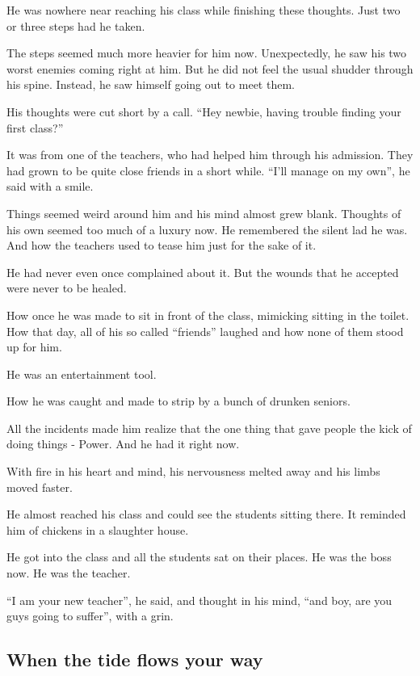 \documentclass[twoside,11pt,titlepage]{article}
\begin{document}
He was nowhere near reaching his class while finishing these thoughts. Just two or three steps had he taken.

The steps seemed much more heavier for him now. Unexpectedly, he saw his two worst enemies coming right at him. But he did not feel the usual shudder through his spine. Instead, he saw himself going out to meet them.

His thoughts were cut short by a call. ``Hey newbie, having trouble finding your first class?''

It was from one of the teachers, who had helped him through his admission. They had grown to be quite close friends in a short while. ``I'll manage on my own'', he said with a smile.

Things seemed weird around him and his mind almost grew blank. Thoughts of his own seemed too much of a luxury now. He remembered the silent lad he was. And how the teachers used to tease him just for the sake of it.

He had never even once complained about it. But the wounds that he accepted were never to be healed.

How once he was made to sit in front of the class, mimicking sitting in the toilet. How that day, all of his so called ``friends'' laughed and how none of them stood up for him.

He was an entertainment tool.

How he was caught and made to strip by a bunch of drunken seniors.

All the incidents made him realize that the one thing that gave people the kick of doing things - Power. And he had it right now.

With fire in his heart and mind, his nervousness melted away and his limbs moved faster.

He almost reached his class and could see the students sitting there. It reminded him of chickens in a slaughter house.

He got into the class and all the students sat on their places. He was the boss now. He was the teacher.

``I am your new teacher'', he said, and thought in his mind, ``and boy, are you guys going to suffer'', with a grin.

\newpage
\begin{center}
  \section{When the tide flows your way}
\end{center}
\bigskip
\bigskip
\bigskip
\end{document}
